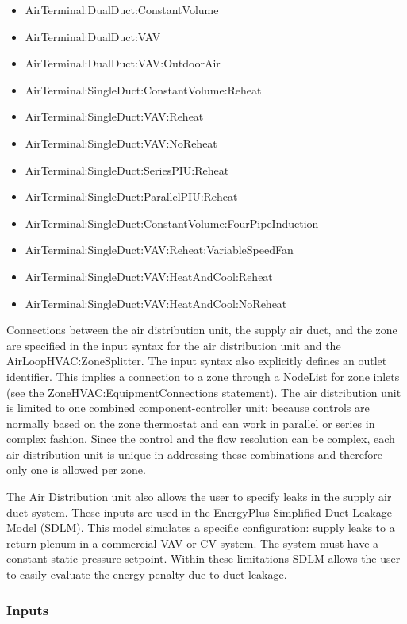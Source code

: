 \begin{itemize}
\item
  AirTerminal:DualDuct:ConstantVolume
\item
  AirTerminal:DualDuct:VAV
\item
  AirTerminal:DualDuct:VAV:OutdoorAir
\item
  AirTerminal:SingleDuct:ConstantVolume:Reheat
\item
  AirTerminal:SingleDuct:VAV:Reheat
\item
  AirTerminal:SingleDuct:VAV:NoReheat
\item
  AirTerminal:SingleDuct:SeriesPIU:Reheat
\item
  AirTerminal:SingleDuct:ParallelPIU:Reheat
\item
  AirTerminal:SingleDuct:ConstantVolume:FourPipeInduction
\item
  AirTerminal:SingleDuct:VAV:Reheat:VariableSpeedFan
\item
  AirTerminal:SingleDuct:VAV:HeatAndCool:Reheat
\item
  AirTerminal:SingleDuct:VAV:HeatAndCool:NoReheat
\end{itemize}

Connections between the air distribution unit, the supply air duct, and the zone are specified in the input syntax for the air distribution unit and the AirLoopHVAC:ZoneSplitter. The input syntax also explicitly defines an outlet identifier. This implies a connection to a zone through a NodeList for zone inlets (see the ZoneHVAC:EquipmentConnections statement). The air distribution unit is limited to one combined component-controller unit; because controls are normally based on the zone thermostat and can work in parallel or series in complex fashion. Since the control and the flow resolution can be complex, each air distribution unit is unique in addressing these combinations and therefore only one is allowed per zone.

The Air Distribution unit also allows the user to specify leaks in the supply air duct system. These inputs are used in the EnergyPlus Simplified Duct Leakage Model (SDLM). This model simulates a specific configuration: supply leaks to a return plenum in a commercial VAV or CV system. The system must have a constant static pressure setpoint. Within these limitations SDLM allows the user to easily evaluate the energy penalty due to duct leakage.

\subsubsection{Inputs}\label{inputs-055}

